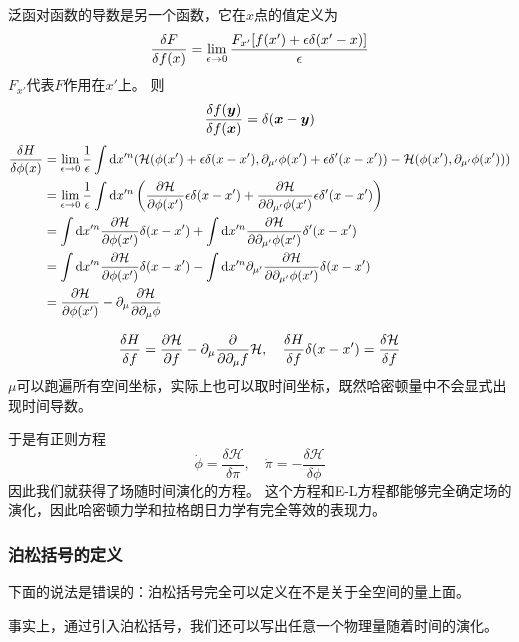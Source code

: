 \documentclass[UTF8, a4paper]{ctexart}
\begin{document}
泛函对函数的导数是另一个函数，它在$x$点的值定义为
\[
    \fdv{F}{f(x)} = \lim_{\epsilon \to 0} \frac{F_{x'}[f(x')+\epsilon \delta(x'-x)]}{\epsilon}
\]
$F_{x'}$代表$F$作用在$x'$上。
则
\[
    \fdv{f(\vb*{y})}{f(\vb*{x})} = \delta (\vb*{x} - \vb*{y})
\]
\[
    \begin{aligned}
        \fdv{H}{\phi(x)} &= \lim_{\epsilon\to 0} \frac{1}{\epsilon} \int \dd x'^n (
            \mathcal{H}(\phi(x') + \epsilon \delta (x - x'), \partial_{\mu'} \phi (x') + \epsilon \delta'(x - x')) - \mathcal{H}(\phi(x'), \partial_{\mu'}\phi(x'))) \\
        &= \lim_{\epsilon\to 0} \frac{1}{\epsilon} \int \dd x'^n \left(
            \pdv{\mathcal{H}}{\phi(x')} \epsilon \delta (x - x') + \pdv{\mathcal{H}}{\partial_{\mu'} \phi(x')} \epsilon \delta'(x - x') 
            \right)
        \\
        &= \int \dd x'^n
        \pdv{\mathcal{H}}{\phi(x')} \delta (x - x') + \int \dd x'^n \pdv{\mathcal{H}}{\partial_{\mu'} \phi(x')} \delta'(x - x') \\
        &= \int \dd x'^n
        \pdv{\mathcal{H}}{\phi(x')} \delta (x - x') - \int \dd x'^n \partial_{\mu'}\pdv{\mathcal{H}}{\partial_{\mu'} \phi(x')} \delta(x - x') \\
        &= \pdv{\mathcal{H}}{\phi(x')} - \partial_\mu \pdv{\mathcal{H}}{\partial_\mu \phi}
    \end{aligned}
\]

\[
    \fdv{H}{f} = \pdv{\mathcal{H}}{f} - \partial_\mu \pdv{\partial_\mu f} \mathcal{H}, \quad \fdv{H}{f} \delta(x - x') = \fdv{\mathcal{H}}{f}
\]
$\mu$可以跑遍所有空间坐标，实际上也可以取时间坐标，既然哈密顿量中不会显式出现时间导数。

于是有正则方程
\begin{equation}
    \dot{\phi} = \frac{\delta \mathcal{H}}{\delta \pi}, \quad \dot{\pi} = - \frac{\delta \mathcal{H}}{\delta \phi}
    \label{eq:canonical-equation}
\end{equation}
因此我们就获得了场随时间演化的方程。
这个方程和E-L方程都能够完全确定场的演化，因此哈密顿力学和拉格朗日力学有完全等效的表现力。

\subsubsection{泊松括号的定义}

下面的说法是错误的：泊松括号完全可以定义在不是关于全空间的量上面。

事实上，通过引入泊松括号，我们还可以写出任意一个物理量随着时间的演化。
\end{document}
